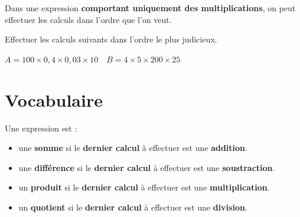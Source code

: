 \documentclass[a4paper]{book}
\begin{document}
    \begin{propriete}
        Dans une expression \textbf{comportant uniquement des multiplications}, on peut effectuer les calculs dans l'ordre que l'on veut.
    \end{propriete}

    \begin{exemple}
        Effectuer les calculs suivants dans l'ordre le plus judicieux.

        $A=100\times 0,4 \times 0,03 \times 10 \quad 
        B=4\times5\times200\times25$
    \end{exemple}

\section{Vocabulaire}

    \begin{definition}
        Une expression est :
        \begin{itemize}
            \item  une \textbf{somme} si le \textbf{dernier calcul} à effectuer est une \textbf{addition}.
            \item  une \textbf{différence} si le \textbf{dernier calcul} à effectuer est une \textbf{soustraction}.
            \item  un \textbf{produit} si le \textbf{dernier calcul} à effectuer est une \textbf{multiplication}.
            \item  un \textbf{quotient} si le \textbf{dernier calcul} à effectuer est une \textbf{division}.
        \end{itemize}
    \end{definition}


\newpage
\end{document}
